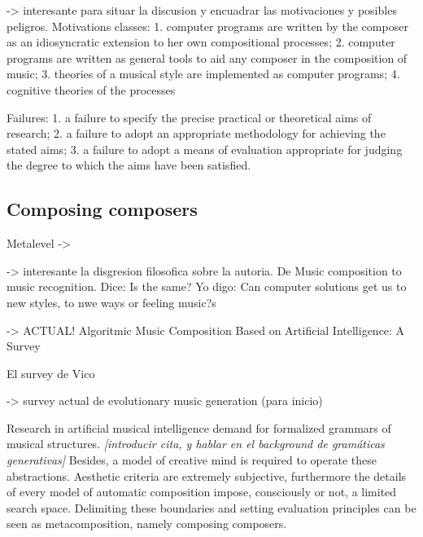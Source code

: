 \documentclass{article}
\begin{document}
{\color{red} 



\cite{Pearce2002} -> interesante para situar la discusion y encuadrar las motivaciones y posibles peligros.
Motivations classes:
1. computer programs are written by the composer as an idiosyncratic extension
to her own compositional processes;
2. computer programs are written as general tools to aid any composer in the
composition of music;
3. theories of a musical style are implemented as computer programs;
4. cognitive theories of the processes

Failures:
1. a failure to specify the precise practical or theoretical aims of research;
2. a failure to adopt an appropriate methodology for achieving the stated aims;
3. a failure to adopt a means of evaluation appropriate for judging the degree to
which the aims have been satisfied.



}

\subsection{Composing composers}


{\color{red}
Metalevel -> \cite{DBLP:journals/aim/Buchanan01}



\cite{JACOB1996} -> interesante la disgresion filosofica sobre la autoria. De Music composition to music recognition. Dice: Is the same? Yo digo: Can computer solutions get us to new styles, to nwe ways or feeling music?s


\cite{LopezRincon2018} -> ACTUAL! Algoritmic Music Composition Based on
Artificial Intelligence: A Survey

El survey de Vico \cite{DBLP:journals/corr/RodriguezV14}


\cite{Dostl2013} -> survey actual de evolutionary music generation (para inicio)
}


Research in artificial musical intelligence demand for formalized
grammars of musical structures. {\color{gray} \textsl{[introducir cita, y hablar en el background de gramáticas generativas]}} Besides, a model of creative
mind is required to operate these abstractions.
Aesthetic criteria are extremely subjective, furthermore the details
of every model of automatic composition impose, consciously
or not, a limited search space. Delimiting these
boundaries and setting evaluation principles can be seen as
metacomposition, namely composing composers.
\end{document}
